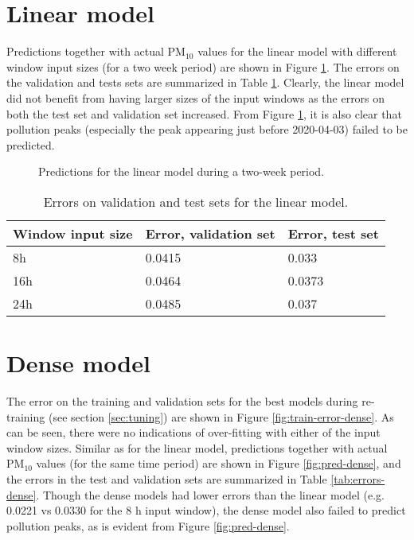 \section{Linear model}

Predictions together with actual PM$_{10}$ values for the linear model with different window input sizes (for a two week period) are shown in Figure \ref{fig:linear_pred}. The errors on the validation and tests sets are summarized in Table \ref{tab:linear_errors}. Clearly, the linear model did not benefit from having larger sizes of the input windows as the errors on both the test set and validation set increased. From Figure \ref{fig:linear_pred}, it is also clear that pollution peaks (especially the peak appearing just before 2020-04-03) failed to be predicted. 

\begin{figure}[htbp]
\begin{center}
\caption{Predictions for the linear model during a two-week period.}
\label{fig:linear_pred}
\end{center}
\end{figure}

\begin{table}[h]
\centering
\caption{Errors on validation and test sets for the linear model. }
\label{tab:linear_errors}
\begin{tabular}{@{}lll@{}}
\toprule
Window input size & Error, validation set & Error, test set \\ \midrule
8h                & 0.0415                & 0.033           \\
16h               & 0.0464                & 0.0373          \\
24h               & 0.0485                & 0.037           \\ \bottomrule
\end{tabular}
\end{table}


\section{Dense model}

The error on the training and validation sets for the best models during re-training (see section \ref{sec:tuning}) are shown in Figure \ref{fig:train-error-dense}. As can be seen, there were no indications of over-fitting with either of the input window sizes. Similar as for the linear model, predictions together with actual PM$_{10}$ values (for the same time period) are shown in Figure \ref{fig:pred-dense}, and the errors in the test and validation sets are summarized in Table \ref{tab:errors-dense}. Though the dense models had lower errors than the linear model (e.g. 0.0221 vs 0.0330 for the 8 h input window), the dense model also failed to predict pollution peaks, as is evident from Figure \ref{fig:pred-dense}.

